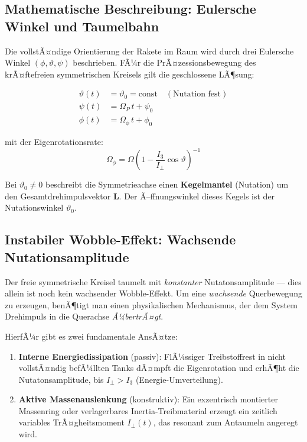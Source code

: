 ﻿\documentclass[12pt,a4paper]{article}
\newcommand{\vek}[1]{\boldsymbol{#1}}
\begin{document}
\subsection{Mathematische Beschreibung: Eulersche Winkel und Taumelbahn}

Die vollstÃ¤ndige Orientierung der Rakete im Raum wird durch drei Eulersche Winkel
$(\phi, \vartheta, \psi)$ beschrieben. FÃ¼r die PrÃ¤zessionsbewegung des krÃ¤ftefreien
symmetrischen Kreisels gilt die geschlossene LÃ¶sung:

\begin{align}
  \vartheta(t) &= \vartheta_0 = \mathrm{const} \quad (\text{Nutation fest})\\
  \psi(t)      &= \Omega_P\,t + \psi_0\\
  \phi(t)      &= \Omega_\phi\,t + \phi_0
\end{align}

mit der Eigenrotationsrate:
\[
  \Omega_\phi = \Omega\left(1 - \frac{I_3}{I_\perp}\cos\vartheta\right)^{-1}
\]

Bei $\vartheta_0 \neq 0$ beschreibt die Symmetrieachse einen \textbf{Kegelmantel}
(Nutation) um den Gesamtdrehimpulsvektor $\vek{L}$. Der Ã–ffnungswinkel dieses
Kegels ist der Nutationswinkel $\vartheta_0$.

\subsection{Instabiler Wobble-Effekt: Wachsende Nutationsamplitude}

Der freie symmetrische Kreisel taumelt mit \emph{konstanter} Nutatonsamplitude ---
dies allein ist noch kein wachsender Wobble-Effekt. Um eine \emph{wachsende}
Querbewegung zu erzeugen, benÃ¶tigt man einen physikalischen Mechanismus, der
dem System Drehimpuls in die Querachse \emph{Ã¼bertrÃ¤gt}.

HierfÃ¼r gibt es zwei fundamentale AnsÃ¤tze:

\begin{enumerate}[leftmargin=*, label=\alph*)]
  \item \textbf{Interne Energiedissipation} (passiv): FlÃ¼ssiger Treibstoffrest
    in nicht vollstÃ¤ndig befÃ¼llten Tanks dÃ¤mpft die Eigenrotation und erhÃ¶ht
    die Nutatonsamplitude, bis $I_\perp > I_3$ (Energie-Umverteilung).
  \item \textbf{Aktive Massenauslenkung} (konstruktiv): Ein exzentrisch montierter
    Massenring oder verlagerbares Inertia-Treibmaterial erzeugt ein zeitlich
    variables TrÃ¤gheitsmoment $I_\perp(t)$, das resonant zum Antaumeln angeregt wird.
\end{enumerate}
\end{document}
